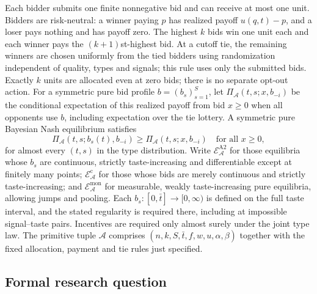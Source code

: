 \documentclass[11pt,a4paper]{article}
\begin{document}
Each bidder submits one finite nonnegative bid and can receive at most
one unit. Bidders are risk-neutral: a winner paying $p$ has realized
payoff $u(q,t)-p$, and a loser pays nothing and has payoff zero.
The highest $k$ bids win one unit each and each winner pays the
$(k+1)$st-highest bid. At a cutoff tie, the remaining winners are
chosen uniformly from the tied bidders using randomization independent
of quality, types and signals; this rule uses only the submitted bids.
Exactly $k$ units are allocated even at zero bids; there is no separate
opt-out action. For a symmetric pure bid profile $b=(b_s)_{s=1}^S$, let
$\Pi_{\mathcal A}(t,s;x,b_{-i})$ be the conditional expectation of this
realized payoff from bid $x\ge0$ when all opponents use $b$, including
expectation over the tie lottery.
A symmetric pure Bayesian Nash equilibrium satisfies
\[
\Pi_{\mathcal A}(t,s;b_s(t),b_{-i})
\ge \Pi_{\mathcal A}(t,s;x,b_{-i})
\quad\text{for all }x\ge0,
\]
for almost every $(t,s)$ in the type distribution. Write
$\mathcal E_{\mathcal A}^{\mathrm{A2}}$ for those equilibria whose
$b_s$ are continuous, strictly taste-increasing and differentiable
except at finitely many points;
$\mathcal E_{\mathcal A}^{\mathrm c}$ for those whose bids are merely
continuous and strictly taste-increasing; and
$\mathcal E_{\mathcal A}^{\mathrm{mon}}$ for measurable, weakly
taste-increasing pure equilibria, allowing jumps and pooling.
Each $b_s:[0,\bar t]\to[0,\infty)$ is defined on the full taste
interval, and the stated regularity is required there, including at
impossible signal--taste pairs. Incentives are required only almost
surely under the joint type law. The primitive tuple $\mathcal A$
comprises $(n,k,S,\bar t,f,w,u,\alpha,\beta)$ together with the fixed
allocation, payment and tie rules just specified.

\subsection*{Formal research question}
\end{document}
